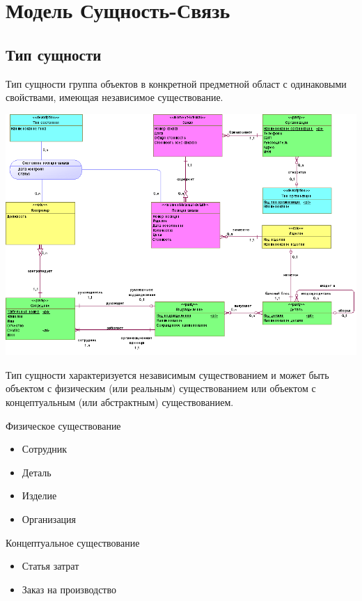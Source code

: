 \documentclass{beamer}
\begin{document}
\section{Модель Сущность-Связь}
\subsection{Тип сущности}
\begin{frame}
\begin{block}{Тип сущности}
группа объектов в конкретной предметной област с одинаковыми свойствами, имеющая независимое существование.
\end{block}
\begin{center}
\includegraphics[scale=0.45]{images/shema-er.png}
\end{center}
\end{frame}

\begin{frame}
Тип сущности характеризуется независимым существованием и может быть объектом с физическим  (или реальным) существованием или объектом с концептуальным (или абстрактным)  существованием.
\begin{block}{Физическое существование}
\begin{itemize}
\item Сотрудник
\item Деталь
\item Изделие
\item Организация
\end{itemize}
\end{block}
\begin{block}{Концептуальное существование}
\begin{itemize}
\item Статья затрат
\item Заказ на производство
\end{itemize}
\end{block}
\end{frame}
\end{document}
